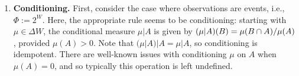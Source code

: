 \begin{subappendices}
    \begin{enumerate}[wide, label=\textbf{\thesubsection.\arabic*}]
    	\item %
    	\textbf{Conditioning.}
    	First, consider the case where observations are events, i.e., $\Phi := 2^W$.
    	Here, the appropriate rule seems to be conditioning:
    	starting with $\mu \in \Delta W$, the conditional measure 
    	$\mu|A$ is given by $(\mu|A)(B) = {\mu(B \cap A)}/{\mu(A)}$, provided $\mu(A) > 0$.
    	Note that $(\mu|A)|A = \mu|A$, so conditioning is idempotent. 
    	There are well-known issues with conditioning $\mu$ on $A$ when
    	$\mu(A) = 0$, 
    	and so typically this operation is left undefined. 


\end{enumerate}
\end{subappendices}
